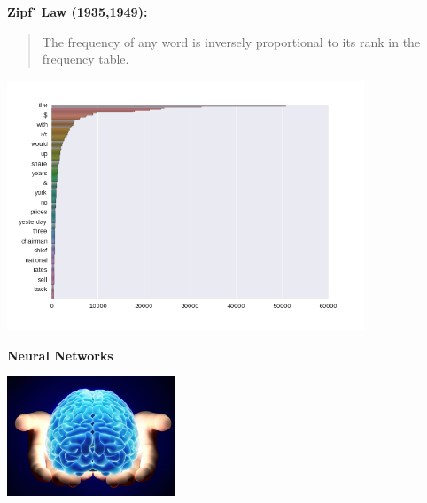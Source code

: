 \documentclass{beamer}
\begin{document}
\begin{frame}
  \textbf{Zipf' Law (1935,1949):}
  \begin{quote}
    The frequency of any word is inversely proportional to its rank in the frequency table.
  \end{quote}


     \begin{center}
       \includegraphics[width=0.8\textwidth]{zipf}         
     \end{center}
\end{frame}


\begin{frame}
  \begin{center}
    \textbf{Neural Networks}
  \end{center}
\end{frame}

\begin{frame}
  \begin{center}
    \includegraphics[width=5cm]{brain}
  \end{center}
\end{frame}
\end{document}
